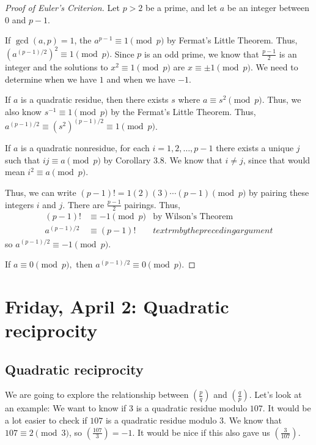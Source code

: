 \documentclass[letterpaper, 11 pt]{article}
\begin{document}
  
\begin{proof}[Proof of Euler's Criterion]  Let $p>2$ be a prime, and let $a$ be an integer between $0$ and $p-1$. 

If $\gcd(a,p)=1$, the $a^{p-1}\equiv 1 \pmod p$ by Fermat's Little Theorem. Thus, $(a^{(p-1)/2})^2\equiv 1 \pmod p.$ Since $p$ is an odd prime, we know that $\frac{p-1}{2}$ is an integer and the solutions to $x^2\equiv 1 \pmod p$ are $x\equiv \pm 1\pmod p$. We need to determine when we have $1$ and when we have $-1$.
 
 If $a$ is a quadratic residue, then there exists $s$ where $a\equiv s^2\pmod p$. Thus, we also know $s^{-1}\equiv 1 \pmod p$ by the Fermat's Little Theorem. Thus, $a^{(p-1)/2}\equiv (s^2)^{(p-1)/2}\equiv 1 \pmod p$.
 
 If $a$ is a quadratic nonresidue, for each $i=1,2,\dots, p-1$ there exists a unique $j$ such that $ij\equiv a \pmod p$ by Corollary 3.8. We know that $i\neq j$, since that would mean $i^2\equiv a\pmod p$. 
 
 Thus, we can write $(p-1)!=1(2)(3)\cdots(p-1)\pmod p$ by pairing these integers $i$ and $j$. There are $\frac{p-1}{2}$ pairings. Thus, 
\begin{align*}
 (p-1)!&\equiv-1\pmod p &\textrm{by Wilson's Theorem}\\
 a^{(p-1)/2}&\equiv(p-1)! &textrm{by the preceding argument}
\end{align*}
so $a^{(p-1)/2}\equiv -1 \pmod p$.

If $a\equiv 0\pmod p,$ then $a^{(p-1)/2}\equiv 0\pmod p$. 
\end{proof}
\section{Friday, April 2: Quadratic reciprocity}
\subsection{Quadratic reciprocity}
We are going to explore the relationship between $\left(\frac{p}{q}\right)$ and $\left(\frac{q}{p}\right)$. Let's look at an example:
   We want to know if $3$ is a quadratic residue modulo $107$. It would be a lot easier to check if $107$ is a quadratic residue modulo $3$. We know that $107\equiv   {2}
 \pmod 3$, so $\left(\frac{107}{3}\right)=  {-1}
 $. It would be nice if this also gave us $\left(\frac{3}{107}\right)$.
  
\end{document}
